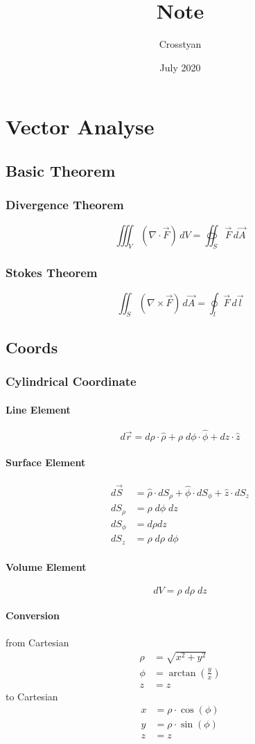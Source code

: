 \documentclass[a4paper]{report}
\title{Note}
\author{Crosstyan}
\date{July 2020}
\begin{document}

\chapter{Vector Analyse}


\section{Basic Theorem}
\subsection{Divergence Theorem}
$$ \iiint_{V} (\nabla\cdot\vec{F})\,dV=\oiint_S\vec{F}\,d\vec{A}$$
\subsection{Stokes Theorem}
$$ \iint_{S}(\nabla\times\vec{F})\,d\vec{A}=\oint_l\vec{F}\,d\vec{l} $$
\section{Coords}
\subsection{Cylindrical Coordinate}
\subsubsection{Line Element}
$$d\vec{r}=d\rho\cdot\hat{\rho}+\rho\;d\phi \cdot\hat{\phi}+dz\cdot \hat{z}$$
\subsubsection{Surface Element}
\begin{align*}
    d\vec{S}&=\hat{\rho}\cdot dS_\rho+\hat{\phi}\cdot dS_\phi+\hat{z}\cdot dS_z\\
    dS_\rho&=\rho\;d\phi\;dz\\
    dS_\phi&=d\rho dz\\
    dS_z&=\rho\;d\rho\; d\phi
\end{align*}
\subsubsection{Volume Element}
$$dV=\rho\;d\rho\;dz$$
\subsubsection{Conversion}
from Cartesian
\begin{align*}
    \rho&=\sqrt{x^2+y^2}\\
    \phi&=\arctan(\frac{y}{x})\\
    z&=z
\end{align*}
to Cartesian
\begin{align*}
    x&=\rho\cdot \cos(\phi)\\
    y&=\rho \cdot \sin(\phi)\\
    z&=z
\end{align*}
\end{document}
